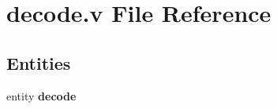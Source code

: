 \section{decode.\-v File Reference}
\label{decode_8v}
\subsection*{Entities}
\begin{DoxyCompactItemize}
\item 
entity {\bf decode}
\end{DoxyCompactItemize}
